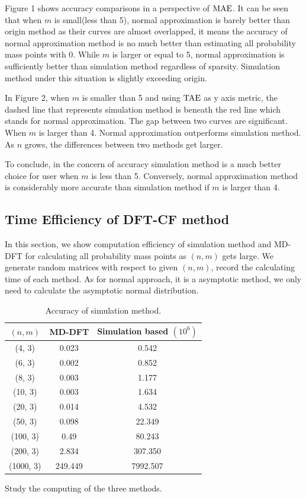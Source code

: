 \documentclass[12pt]{article}
\newcommand{\TAE}{{\rm TAE}}
\newcommand{\MAE}{{\rm MAE}}
\begin{document}


Figure 1 shows accuracy comparisons in a perspective of $\MAE$. It can be seen that when $m$ is small(less than 5), normal approximation is barely better than origin method as their curves are almost overlapped, it means the accuracy of normal approximation method is no much better than estimating all probability mass points with 0. While $m$ is larger or equal to 5, normal approximation is sufficiently better than simulation method regardless of sparsity. Simulation method under this situation is slightly exceeding origin.

In Figure 2, when $m$ is smaller than 5 and using $\TAE$ as y axis metric, the dashed line that represents simulation method is beneath the red line which stands for normal approximation. The gap between two curves are significant. When $m$ is larger than 4. Normal approximation outperforms simulation method. As $n$ grows, the differences between two methods get larger.

To conclude, in the concern of accuracy simulation method is a much better choice for user when $m$ is less than 5. Conversely, normal approximation method is considerably more accurate than simulation method if $m$ is larger than 4.
\subsection{Time Efficiency of DFT-CF method}
In this section, we show computation efficiency of simulation method and MD-DFT for calculating all probability mass points as $(n,m)$ gets large. We generate random matrices with respect to given $(n, m)$, record the calculating time of each method. As for normal approach, it is a asymptotic method, we only need to calculate the asymptotic normal distribution.

\begin{table}%
\centering
\caption{Accuracy of simulation method.}\label{tab:my_label}
\begin{tabular}{c|c|c}
\hline
\hline
     $(n, m)$ & MD-DFT & Simulation based $(10^6)$  \\
\hline
    (4, 3) & 0.023 & 0.542 \\
\hline
    (6, 3) & 0.002 & 0.852\\
\hline
    (8, 3) & 0.003 & 1.177\\
    (10, 3) & 0.003 & 1.634\\
    (20, 3) & 0.014 & 4.532\\
    (50, 3) & 0.098 & 22.349\\
    (100, 3) & 0.49 & 80.243\\
    (200, 3) & 2.834 & 307.350\\
    (1000, 3) & 249.449  & 7992.507 \\
\hline\hline
\end{tabular}
\end{table}
Study the computing of the three methods.
\end{document}
